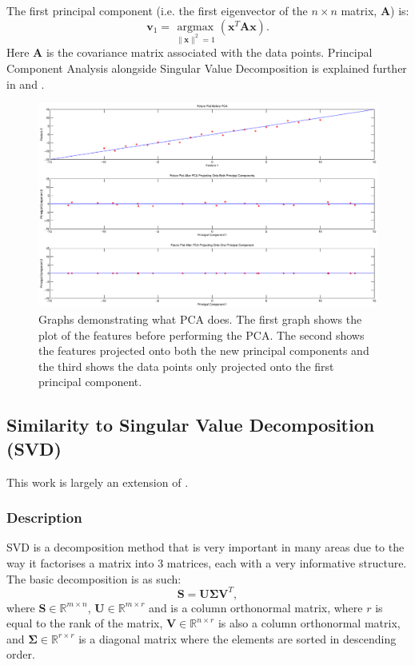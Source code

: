 \documentclass[11pt,a4paper]{article}
\newcommand{\covmat}{\mathbf{A}}
\begin{document}
The first principal component (i.e. the first eigenvector of the $n\times n$ matrix, $\mathbf{A}$) is:
\begin{equation}
\mathbf{v}_1 = \underset{\|\mathbf{x}\|^2 = 1}{\operatorname{argmax}}\left( \mathbf{x}^T\mathbf{A}\mathbf{x}\right).
\end{equation}
Here $\covmat$ is the covariance matrix associated with the data points. Principal Component Analysis alongside Singular Value Decomposition is explained further in \cite{datascience} and \cite{bishop}. 

\begin{figure}[H]
\centering
\includegraphics[scale=0.3]{PCA_EXPLAINED.eps}
\caption{Graphs demonstrating what PCA does. The first graph shows the plot of the features before performing the PCA. The second shows the features projected onto both the new principal components and the third shows the data points only projected onto the first principal component.}
\label{pca}
\end{figure}

\subsection{Similarity to Singular Value Decomposition (SVD)}
This work is largely an extension of \cite{lecture_svd}.

\subsubsection{Description}
SVD is a decomposition method that is very important in many areas due to the way it factorises a matrix into 3 matrices, each with a very informative structure. The basic decomposition is as such:
\begin{equation}
\mathbf{S} = \mathbf{U}\mathbf{\Sigma}\mathbf{V}^T,
\end{equation}
where $\mathbf{S} \in \mathbb{R}^{m \times n}$,  $\mathbf{U} \in \mathbb{R}^{m \times r}$ and is a column orthonormal matrix, where $r$ is equal to the rank of the matrix,  $\mathbf{V} \in \mathbb{R}^{n \times r}$ is also a column orthonormal matrix, and  $\mathbf{\Sigma} \in \mathbb{R}^{r \times r}$ is a diagonal matrix where the elements are sorted in descending order.
\end{document}
